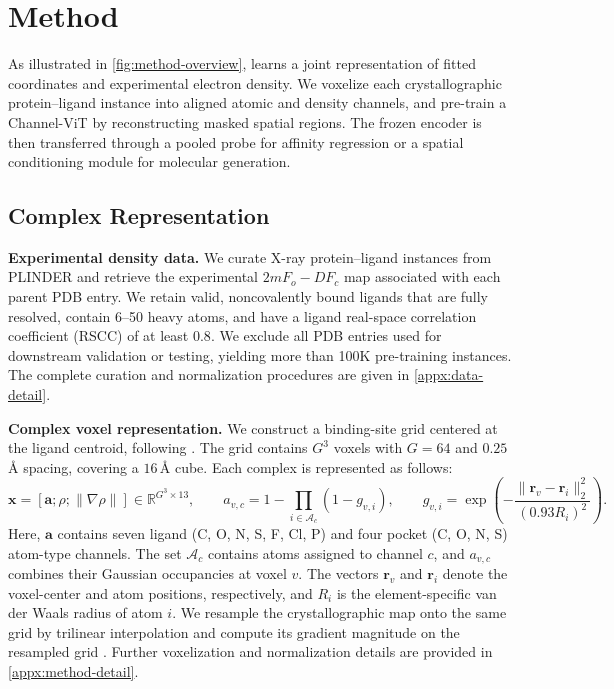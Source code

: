 
\section{Method}
\label{sec:method}

As illustrated in \cref{fig:method-overview}, \ours{} learns a joint
representation of fitted coordinates and experimental electron density. We
voxelize each crystallographic protein--ligand instance into aligned atomic and
density channels, and pre-train a Channel-ViT by reconstructing masked spatial
regions. The frozen encoder is then transferred through a pooled probe for
affinity regression or a spatial conditioning module for molecular generation.



\subsection{Complex Representation}

\textbf{Experimental density data.}
We curate X-ray protein--ligand instances from PLINDER
\citep{durairaj2024plinder} and retrieve the experimental $2mF_o-DF_c$ map
associated with each parent PDB entry. We retain valid, noncovalently bound
ligands that are fully resolved, contain 6--50 heavy atoms, and have a ligand
real-space correlation coefficient (RSCC) of at least $0.8$. We exclude all PDB
entries used for downstream validation or testing, yielding more than 100K
pre-training instances. The complete curation and normalization procedures are
given in \cref{appx:data-detail}.

\textbf{Complex voxel representation.}
We construct a binding-site grid centered at the ligand centroid, following
\citet{pinheiro2024structure}. The grid contains $G^3$ voxels with $G=64$ and
$0.25$\,\AA{} spacing, covering a $16$\,\AA{} cube. Each complex is represented
as follows:
\begin{equation}
\mathbf{x}=[\mathbf{a};\rho;\lVert\nabla\rho\rVert]
\in\mathbb{R}^{G^3\times13},
\qquad
a_{v,c}=1-\prod_{i\in\mathcal{A}_c}(1-g_{v,i}),
\qquad
g_{v,i}=\exp\!\left(
-\frac{\lVert\mathbf r_v-\mathbf r_i\rVert_2^2}{(0.93R_i)^2}
\right).
\label{eq:complex-voxel}
\end{equation}
Here, $\mathbf a$ contains seven ligand (C, O, N, S, F, Cl, P) and four pocket
(C, O, N, S) atom-type channels. The set $\mathcal A_c$ contains atoms assigned
to channel $c$, and $a_{v,c}$ combines their Gaussian occupancies at voxel $v$.
The vectors $\mathbf r_v$ and $\mathbf r_i$ denote the voxel-center and atom
positions, respectively, and $R_i$ is the element-specific van der Waals radius
of atom $i$. We resample the crystallographic map onto the same grid by
trilinear interpolation and compute its gradient magnitude on the resampled
grid \citep{suriana2025beyond}. Further voxelization and normalization details
are provided in \cref{appx:method-detail}.

